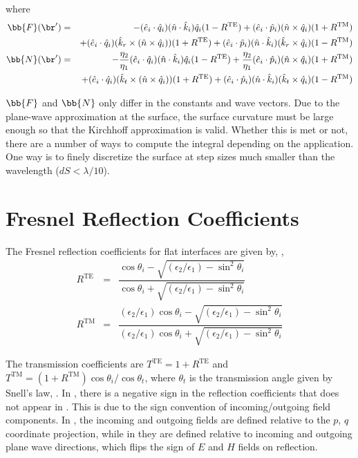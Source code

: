 \noindent where
\begin{eqnarray}
\bb{F}(\br') &=&  - (\hat{e}_i \cdot \hat{q}_i )(\hat{n} \cdot \hat{k}_i) \hat{q}_i (1 - R^{\textrm{TE}}) + (\hat{e}_i \cdot \hat{p}_i )(\hat{n} \times \hat{q}_i) (1 + R^{\textrm{TM}}) \nonumber \\
\ & \ &+ (\hat{e}_i \cdot \hat{q}_i )(\hat{k}_r \times (\hat{n} \times \hat{q}_i)) (1 + R^{\textrm{TE}})  + (\hat{e}_i \cdot \hat{p}_i )(\hat{n} \cdot \hat{k}_i) (\hat{k}_r \times \hat{q}_i) (1 - R^{\textrm{TM}}) \\
\bb{N}(\br') &=&  - \dfrac{\eta_2}{\eta_1}(\hat{e}_i \cdot \hat{q}_i )(\hat{n} \cdot \hat{k}_i) \hat{q}_i (1 - R^{\textrm{TE}}) + \dfrac{\eta_2}{\eta_1}(\hat{e}_i \cdot \hat{p}_i )(\hat{n} \times \hat{q}_i) (1 + R^{\textrm{TM}}) \nonumber \\
\ & \ &+ (\hat{e}_i \cdot \hat{q}_i )(\hat{k}_t \times (\hat{n} \times \hat{q}_i)) (1 + R^{\textrm{TE}}) + (\hat{e}_i \cdot \hat{p}_i )(\hat{n} \cdot \hat{k}_i) (\hat{k}_t \times \hat{q}_i) (1 - R^{\textrm{TM}}) 
\end{eqnarray}

$\bb{F}$ and $\bb{N}$ only differ in the constants and wave vectors.  Due to the plane-wave approximation at the surface, the surface curvature must be large enough so that the Kirchhoff approximation is valid. Whether this is met or not, there are a number of ways to compute the integral depending on the application. One way is to finely discretize the surface at step sizes much smaller than the wavelength ($dS<\lambda/10$).  

\section{Fresnel Reflection Coefficients}
\label{fresenlref}
The Fresnel reflection coefficients for flat interfaces are given by, \cite{kong1986electromagnetic},
\begin{eqnarray}
R^{\textrm{TE}} &=& \dfrac{ \cos \theta_i - \sqrt{(\epsilon_2/\epsilon_1) - \sin^2\theta_i }}{\cos \theta_i + \sqrt{(\epsilon_2/\epsilon_1) - \sin^2\theta_i }} \\
R^{\textrm{TM}} &=& \dfrac{(\epsilon_2/\epsilon_1) \cos \theta_i - \sqrt{(\epsilon_2/\epsilon_1) - \sin^2\theta_i }}{(\epsilon_2/\epsilon_1) \cos \theta_i + \sqrt{(\epsilon_2/\epsilon_1) - \sin^2\theta_i }} 
\end{eqnarray}

The transmission coefficients are $T^{\textrm{TE}} = 1 + R^{\textrm{TE}}$ and $T^{\textrm{TM}} = (1 + R^{\textrm{TM}})\cos\theta_i/\cos\theta_t $, where $\theta_t$ is the transmission angle given by Snell's law, \cite{ulaby1999fundamentals}. In \cite{ulaby1999fundamentals}, there is a negative sign in the reflection coefficients that does not appear in \cite{kong1986electromagnetic}. This is due to the sign convention of incoming/outgoing field components. In \cite{kong1986electromagnetic}, the incoming and outgoing fields are defined relative to the $p$, $q$ coordinate projection, while in \cite{ulaby1999fundamentals} they are defined relative to incoming and outgoing plane wave directions, which flips the sign of $E$ and $H$ fields on reflection.  

